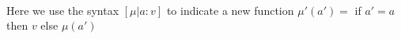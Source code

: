 \\
Here we use the syntax $[\mu | a : v]$ to indicate a new function $\mu'(a') = $ if $a' = a$ then $v$ else $\mu(a')$
\begin{mathpar}






\end{mathpar}
\begin{mathpar}


\end{mathpar}

